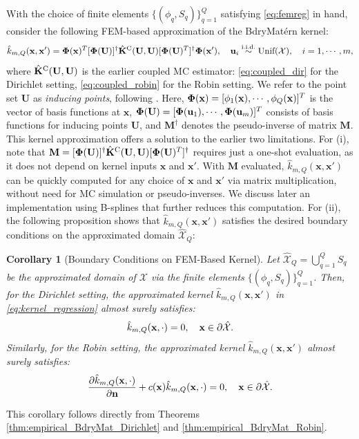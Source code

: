 \documentclass[aos,preprint]{imsart}
\theoremstyle{plain}
\newcommand{\CalX}{\mathcal X}
\newcommand{\BFx}{\bold x}
\newcommand{\BU}{\bold U}
\newcommand{\BK}{\bold K}
\newcommand{\BPhi}{\boldsymbol{\Phi}}
\newtheorem{corollary}{Corollary}
\theoremstyle{remark}
\begin{document}
With the choice of finite elements $\{(\phi_q, S_q)\}_{q=1}^Q$ satisfying \eqref{eq:femreg} in hand, consider the following FEM-based approximation of the BdryMat\'ern kernel:
\begin{equation}
\label{eq:kernel_regression}
    \hat{k}_{m,Q}(\BFx, \BFx') = \BPhi(\BFx)^T [\BPhi(\BU)]^\dagger \hat{\BK}^{\rm C}(\BU, \BU) [\BPhi(\BU)^T]^\dagger \BPhi(\BFx'), \quad \mathbf{u}_i \overset{\text{i.i.d.}}{\sim}\text{Unif}(\mathcal{X}), \quad i = 1, \cdots, m,
\end{equation}
where $\hat{\BK}^{\rm C}(\BU, \BU)$ is the earlier coupled MC estimator: \eqref{eq:coupled_dir} for the Dirichlet setting, \eqref{eq:coupled_robin} for the Robin setting. We refer to the point set $\mathbf{U}$ as \textit{inducing points}, following \cite{snelson2005sparse,li2025prospar}. Here, $\BPhi(\BFx) = [\phi_1(\BFx), \cdots, \phi_Q(\BFx)]^T$ is the vector of basis functions at $\mathbf{x}$, $\BPhi(\BU) =[\BPhi(\mathbf{u}_1), \cdots, \BPhi(\mathbf{u}_m)]^T$ consists of basis functions for inducing points $\mathbf{U}$, and $\mathbf{M}^\dagger$ denotes the pseudo-inverse of matrix $\mathbf{M}$. This kernel approximation offers a solution to the earlier two limitations. For (i), note that $\mathbf{M} = [\BPhi(\BU)]^\dagger \hat{\BK}^{\rm C}(\BU, \BU) [\BPhi(\BU)^T]^\dagger$ requires just a one-shot evaluation, as it does not depend on kernel inputs $\mathbf{x}$ and $\mathbf{x}'$. With $\mathbf{M}$ evaluated, $\hat{k}_{m,Q}(\mathbf{x},\mathbf{x}')$ can be quickly computed for any choice of $\mathbf{x}$ and $\mathbf{x}'$ via matrix multiplication, without need for MC simulation or pseudo-inverses. We discuss later an implementation using B-splines that further reduces this computation. For (ii), the following proposition shows that $\hat{k}_{m,Q}(\mathbf{x},\mathbf{x}')$ satisfies the desired boundary conditions on the approximated domain $\hat{\CalX}_Q$:
\begin{corollary}[Boundary Conditions on FEM-Based Kernel]
\label{coro:posotive_hat_K}
    Let $\hat{\CalX}_Q = \bigcup_{q=1}^Q S_q$ be the approximated domain of \(\CalX\) via the finite elements \(\{(\phi_q, S_q)\}_{q=1}^Q\). Then, for the Dirichlet setting, the approximated kernel $\hat{k}_{m,Q}(\mathbf{x},\mathbf{x}')$ in \eqref{eq:kernel_regression} almost surely satisfies: 
    \begin{equation}
        \hat{k}_{m,Q}(\BFx, \cdot) = 0, \quad \BFx \in \partial \hat{\CalX}.
    \end{equation}
    Similarly, for the Robin setting, the approximated kernel $\hat{k}_{m,Q}(\mathbf{x},\mathbf{x}')$ almost surely satisfies:
    \begin{equation}
    \frac{\partial\hat{k}_{m,Q}(\BFx, \cdot)}{\partial\bold{n}}+c(\BFx)\hat{k}_{m,Q}(\BFx, \cdot) = 0,\quad \BFx \in \partial \hat{\CalX}.
    \end{equation}    
\end{corollary}
\noindent This corollary follows directly from Theorems \ref{thm:empirical_BdryMat_Dirichlet} and \ref{thm:empirical_BdryMat_Robin}.
\end{document}
